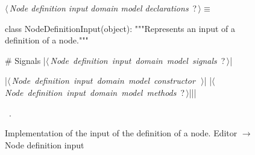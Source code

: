 \documentclass[%
    a4paper,    %
    justified,  %
    nobib,      %
    openany     %
]{tufte-book}
\begin{document}
\begin{figure}
\begin{flushleft} \small
\begin{minipage}{\linewidth}\label{scrap134}\raggedright\small
{} $\langle\,${\itshape Node definition input domain model declarations}\nobreak\ {\footnotesize {?}}$\,\rangle\equiv$
\vspace{-1ex}
\begin{pythoncode}
class NodeDefinitionInput(object):
    """Represents an input of a definition of a node."""

    # Signals
    |\hbox{$\langle\,${\itshape Node definition input domain model signals}\nobreak\ {\footnotesize ?}$\,\rangle$}|

    |\hbox{$\langle\,${\itshape Node definition input domain model constructor}\nobreak\ {\footnotesize {}}$\,\rangle$}|
    |\hbox{$\langle\,${\itshape Node definition input domain model methods}\nobreak\ {\footnotesize ?}$\,\rangle$}||\NWsep|
\end{pythoncode}
\vspace{1.5ex}
\footnotesize
\begin{list}{}{\setlength{\itemsep}{-\parsep}\setlength{\itemindent}{-\leftmargin}}
\item \NWtxtMacroRefIn\ .

\item{}
\end{list}
\end{minipage}\vspace{4ex}
\end{flushleft}
\caption{Implementation of the input of the definition of a node.
  \newline{}\newline{}Editor $\rightarrow$ Node definition input}
\label{editor:lst:node-definition-input}
\end{figure}
\end{document}
